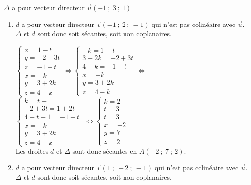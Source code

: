 \documentclass{cornouaille}
\begin{document}
\begin{solution}
  $\Delta$ a pour vecteur directeur $\overrightarrow{u}(-1\ ;\ 3\ ;\ 1)$

\begin{enumerate}
\item  $d$ a pour vecteur directeur $\overrightarrow{v}(-1\ ;\ 2\ ;\
  -1)$ qui n'est pas colinéaire avec $\overrightarrow{u}$. $\Delta$ et
  $d$ sont donc soit sécantes, soit non coplanaires.

\hspace{-5mm}$\begin{cases}
  x=1-t\\y=-2+3t\\z=-1+t\\x=-k\\y=3+2k\\z=4-k \end{cases}\Leftrightarrow \begin{cases}
  -k=1-t\\3+2k=-2+3t\\4-k=-1+t\\x=-k\\y=3+2k\\z=4-k \end{cases}\Leftrightarrow$\\
\hspace*{-5mm}$\begin{cases} k=t-1\\-2+3t=1+2t\\4-t+1=-1+t\\x=-k\\y=3+2k\\z=4-k\end{cases}$
$\Leftrightarrow \begin{cases} k=2\\t=3\\t=3\\x=-2\\y=7\\z=2 \end{cases}$\\
Les droites $d$ et $\Delta$ sont donc sécantes en $A(-2\ ;\ 7\ ;\ 2)$.
\item $d$ a pour vecteur directeur $\overrightarrow{v}(1\ ;\ -2\ ;\ -1)$ qui n'est pas colinéaire avec $\overrightarrow{u}$. $\Delta$ et $d$ sont donc soit sécantes, soit non coplanaires.


\end{enumerate}
\end{solution}
\end{document}
